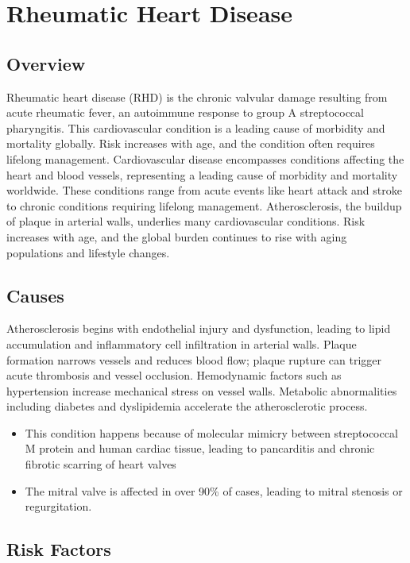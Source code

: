 \chapter{Rheumatic Heart Disease}
\label{sec:Rheumatic Heart Disease}

\section{Overview}
Rheumatic heart disease (RHD) is the chronic valvular damage resulting from acute rheumatic fever, an autoimmune response to group A streptococcal pharyngitis. This cardiovascular condition is a leading cause of morbidity and mortality globally. Risk increases with age, and the condition often requires lifelong management. Cardiovascular disease encompasses conditions affecting the heart and blood vessels, representing a leading cause of morbidity and mortality worldwide. These conditions range from acute events like heart attack and stroke to chronic conditions requiring lifelong management. Atherosclerosis, the buildup of plaque in arterial walls, underlies many cardiovascular conditions. Risk increases with age, and the global burden continues to rise with aging populations and lifestyle changes.
\section{Causes}
Atherosclerosis begins with endothelial injury and dysfunction, leading to lipid accumulation and inflammatory cell infiltration in arterial walls. Plaque formation narrows vessels and reduces blood flow; plaque rupture can trigger acute thrombosis and vessel occlusion. Hemodynamic factors such as hypertension increase mechanical stress on vessel walls. Metabolic abnormalities including diabetes and dyslipidemia accelerate the atherosclerotic process.

\begin{itemize}[noitemsep]
  \item This condition happens because of molecular mimicry between streptococcal M protein and human cardiac tissue, leading to pancarditis and chronic fibrotic scarring of heart valves
  \item The mitral valve is affected in over 90\% of cases, leading to mitral stenosis or regurgitation.
\end{itemize}
\section{Risk Factors}


